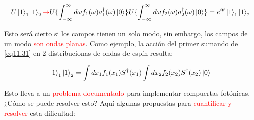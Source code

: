 \documentclass{book}
\begin{document}
\begin{equation}\label{eq11.34}U\ket{1}_1\ket{1}_2\textcolor{red}{\rightarrow}U\{\int_{-\infty}^\infty d\omega f_1(\omega)a_1^\dag(\omega)\ket{0} \}U\{\int_{-\infty}^\infty d\omega f_2(\omega)a_2^\dag(\omega)\ket{0}\}=e^{i\theta}\ket{1}_1\ket{1}_2\end{equation}

Esto será cierto si los campos tienen un solo modo, sin embargo, los campos de un modo \textcolor{red}{son ondas planas}. Como ejemplo, la acción del primer sumando de \ref{eq11.31} en 2 distribucionas de ondas de espín resulta:

\begin{equation}\label{eq11.35}\ket{1}_1\ket{1}_2=\int dx_1 f_1(x_1)S^\dag(x_1)\int dx_2 f_2(x_2) S^\dag(x_2)\ket{0}\end{equation}

Esto lleva a un \textcolor{red}{problema documentado} para implementar compuertas fotónicas. ¿Cómo se puede resolver esto? Aquí algunas propuestas para \textcolor{red}{cuantificar y resolver} esta dificultad:
\end{document}
